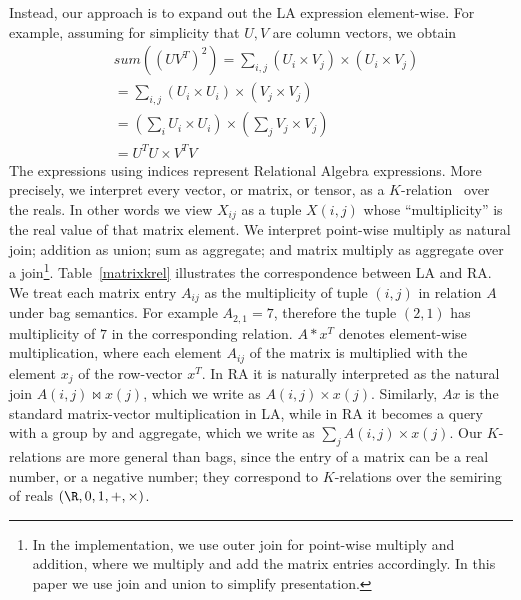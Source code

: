 Instead, our approach is to expand out the LA expression element-wise.
For example, assuming for simplicity that $U,V$ are column vectors, we
obtain
\begin{align*}
& sum((UV^T)^2) = \textstyle{\sum_{i,j}} (U_i \times V_j) \times (U_i \times V_j) \\
& = \textstyle{\sum_{i,j}}(U_i \times U_i) \times (V_j \times V_j) \\
& = ( \textstyle{\sum_i} U_i \times U_i) \times ( \textstyle{\sum_j} V_j \times V_j)  \\
& = U^TU \times V^TV
\end{align*}
%
The expressions using indices represent Relational Algebra
expressions.  More precisely, we interpret every vector, or matrix, or
tensor, as a $K$-relation~\cite{DBLP:conf/pods/GreenKT07} over the
reals. In other words we view $X_{ij}$ as a tuple $X(i,j)$ whose
``multiplicity'' is the real value of that matrix element.  We
interpret point-wise multiply as natural join; addition as union; sum
as aggregate; and matrix multiply as aggregate over a join\footnote{In
  the implementation, we use outer join for point-wise multiply and
  addition, where we multiply and add the matrix entries
  accordingly. In this paper we use join and union to simplify
  presentation.}.
%
Table~\ref{matrixkrel} illustrates the correspondence between LA and
RA.  We treat each matrix entry $A_{ij}$ as the multiplicity of tuple
$(i, j)$ in relation $A$ under bag semantics. For example
$A_{2,1} = 7$, therefore the tuple $(2,1)$ has multiplicity of $7$ in
the corresponding relation. 
$A*x^T$ denotes element-wise
multiplication, where each element $A_{ij}$ of the matrix is
multiplied with the element $x_j$ of the row-vector $x^T$.  In RA it
is naturally interpreted as the natural join $A(i,j) \Join x(j)$,
which we write as $A(i,j) \times x(j)$.  Similarly, $Ax$ is the standard
matrix-vector multiplication in LA, while in RA it becomes a query
with a group by and aggregate, which we write as $\sum_j A(i,j) \times x(j)$.
Our $K$-relations are more general than bags, since the entry of a
matrix can be a real number, or a negative number; they correspond to
$K$-relations over the semiring of reals $(\R, 0, 1, +, \times)$.

